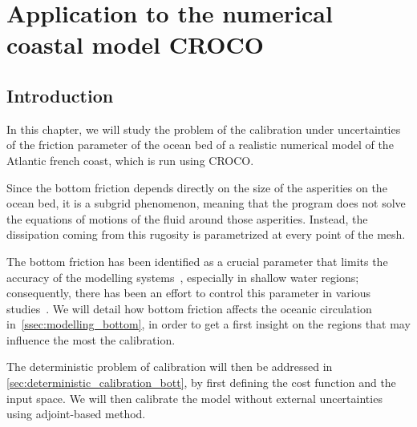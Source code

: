 \documentclass[../../Main_ManuscritThese.tex]{subfiles}
\newcommand{\CROCO}{CROCO}
\begin{document}
\chapter{Application to the numerical coastal model \CROCO}
\label{chap:croco}
\minitoc
\subfileLocal{\pagestyle{contentStyle}}

\section{Introduction}
\label{sec:intro_croco}


In this chapter, we will study the problem of the calibration under
uncertainties of the friction parameter of the ocean bed of a realistic
numerical model of the Atlantic french coast, which is run using \CROCO. 

Since the bottom friction depends directly on the size of the
asperities on the ocean bed, it is a subgrid phenomenon, meaning that
the program does not solve the equations of motions of the fluid
around those asperities. Instead, the dissipation coming from this
rugosity is parametrized at every point of the mesh.

The bottom friction has been identified as a crucial parameter that
limits the accuracy of the modelling
systems~\cite{sinha_principal_1997,kreitmair_effect_2019}, especially
in shallow water regions; consequently, there has been an effort to
control this parameter in various
studies~\cite{das_variational_1992,das_estimation_1991,boutet_estimation_2015}.
We will detail how bottom friction affects the oceanic circulation
in~\cref{ssec:modelling_bottom}, in order to get a first insight on
the regions that may influence the most the calibration.

The deterministic problem of calibration will then be addressed in
\cref{sec:deterministic_calibration_bott}, by first defining the cost
function and the input space. We will then calibrate the model
without external uncertainties using adjoint-based method.
\end{document}
